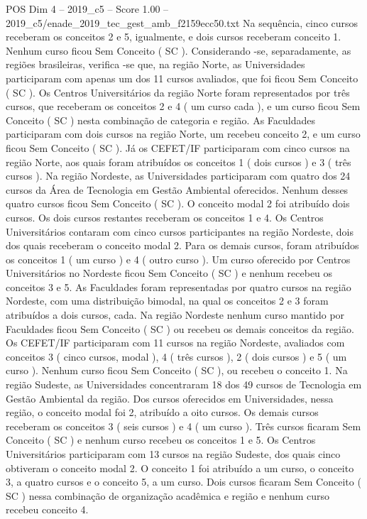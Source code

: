 \begin{textsample}{POS Dim 4 – 2019\_c5 – Score 1.00 – 2019\_c5/enade\_2019\_tec\_gest\_amb\_f2159ecc50.txt}
Na sequência, cinco cursos receberam os conceitos 2 e 5, igualmente, e dois cursos receberam conceito 1.
Nenhum curso ficou Sem Conceito ( SC ).
Considerando -se, separadamente, as regiões brasileiras, verifica -se que, na região Norte, as Universidades participaram com apenas um dos 11 cursos avaliados, que foi ficou Sem Conceito ( SC ).
Os Centros Universitários da região Norte foram representados por três cursos, que receberam os conceitos 2 e 4 ( um curso cada ), e um curso ficou Sem Conceito ( SC ) nesta combinação de categoria e região.
As Faculdades participaram com dois cursos na região Norte, um recebeu conceito 2, e um curso ficou Sem Conceito ( SC ).
Já os CEFET/IF participaram com cinco cursos na região Norte, aos quais foram atribuídos os conceitos 1 ( dois cursos ) e 3 ( três cursos ).
Na região Nordeste, as Universidades participaram com quatro dos 24 cursos da Área de Tecnologia em Gestão Ambiental oferecidos.
Nenhum desses quatro cursos ficou Sem Conceito ( SC ).
O conceito modal 2 foi atribuído dois cursos.
Os dois cursos restantes receberam os conceitos 1 e 4.
Os Centros Universitários contaram com cinco cursos participantes na região Nordeste, dois dos quais receberam o conceito modal 2.
Para os demais cursos, foram atribuídos os conceitos 1 ( um curso ) e 4 ( outro curso ).
Um curso oferecido por Centros Universitários no Nordeste ficou Sem Conceito ( SC ) e nenhum recebeu os conceitos 3 e 5.
As Faculdades foram representadas por quatro cursos na região Nordeste, com uma distribuição bimodal, na qual os conceitos 2 e 3 foram atribuídos a dois cursos, cada.
Na região Nordeste nenhum curso mantido por Faculdades ficou Sem Conceito ( SC ) ou recebeu os demais conceitos da região.
Os CEFET/IF participaram com 11 cursos na região Nordeste, avaliados com conceitos 3 ( cinco cursos, modal ), 4 ( três cursos ), 2 ( dois cursos ) e 5 ( um curso ).
Nenhum curso ficou Sem Conceito ( SC ), ou recebeu o conceito 1.
Na região Sudeste, as Universidades concentraram 18 dos 49 cursos de Tecnologia em Gestão Ambiental da região.
Dos cursos oferecidos em Universidades, nessa região, o conceito modal foi 2, atribuído a oito cursos.
Os demais cursos receberam os conceitos 3 ( seis cursos ) e 4 ( um curso ).
Três cursos ficaram Sem Conceito ( SC ) e nenhum curso recebeu os conceitos 1 e 5.
Os Centros Universitários participaram com 13 cursos na região Sudeste, dos quais cinco obtiveram o conceito modal 2.
O conceito 1 foi atribuído a um curso, o conceito 3, a quatro cursos e o conceito 5, a um curso.
Dois cursos ficaram Sem Conceito ( SC ) nessa combinação de organização acadêmica e região e nenhum curso recebeu conceito 4.

\end{textsample}
